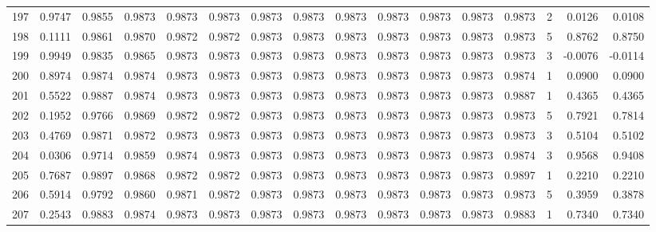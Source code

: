 \begin{tabular}{lrrrrrrrrrrrrrrr}
197 &      0.9747 &  0.9855 &  0.9873 &  0.9873 &  0.9873 &  0.9873 &  0.9873 &  0.9873 &  0.9873 &  0.9873 &   0.9873 &     0.9873 &      2 &                    0.0126 &                     0.0108 \\
198 &      0.1111 &  0.9861 &  0.9870 &  0.9872 &  0.9872 &  0.9873 &  0.9873 &  0.9873 &  0.9873 &  0.9873 &   0.9873 &     0.9873 &      5 &                    0.8762 &                     0.8750 \\
199 &      0.9949 &  0.9835 &  0.9865 &  0.9873 &  0.9873 &  0.9873 &  0.9873 &  0.9873 &  0.9873 &  0.9873 &   0.9873 &     0.9873 &      3 &                   -0.0076 &                    -0.0114 \\
200 &      0.8974 &  0.9874 &  0.9874 &  0.9873 &  0.9873 &  0.9873 &  0.9873 &  0.9873 &  0.9873 &  0.9873 &   0.9873 &     0.9874 &      1 &                    0.0900 &                     0.0900 \\
201 &      0.5522 &  0.9887 &  0.9874 &  0.9873 &  0.9873 &  0.9873 &  0.9873 &  0.9873 &  0.9873 &  0.9873 &   0.9873 &     0.9887 &      1 &                    0.4365 &                     0.4365 \\
202 &      0.1952 &  0.9766 &  0.9869 &  0.9872 &  0.9872 &  0.9873 &  0.9873 &  0.9873 &  0.9873 &  0.9873 &   0.9873 &     0.9873 &      5 &                    0.7921 &                     0.7814 \\
203 &      0.4769 &  0.9871 &  0.9872 &  0.9873 &  0.9873 &  0.9873 &  0.9873 &  0.9873 &  0.9873 &  0.9873 &   0.9873 &     0.9873 &      3 &                    0.5104 &                     0.5102 \\
204 &      0.0306 &  0.9714 &  0.9859 &  0.9874 &  0.9873 &  0.9873 &  0.9873 &  0.9873 &  0.9873 &  0.9873 &   0.9873 &     0.9874 &      3 &                    0.9568 &                     0.9408 \\
205 &      0.7687 &  0.9897 &  0.9868 &  0.9872 &  0.9872 &  0.9873 &  0.9873 &  0.9873 &  0.9873 &  0.9873 &   0.9873 &     0.9897 &      1 &                    0.2210 &                     0.2210 \\
206 &      0.5914 &  0.9792 &  0.9860 &  0.9871 &  0.9872 &  0.9873 &  0.9873 &  0.9873 &  0.9873 &  0.9873 &   0.9873 &     0.9873 &      5 &                    0.3959 &                     0.3878 \\
207 &      0.2543 &  0.9883 &  0.9874 &  0.9873 &  0.9873 &  0.9873 &  0.9873 &  0.9873 &  0.9873 &  0.9873 &   0.9873 &     0.9883 &      1 &                    0.7340 &                     0.7340 \\

\end{tabular}
